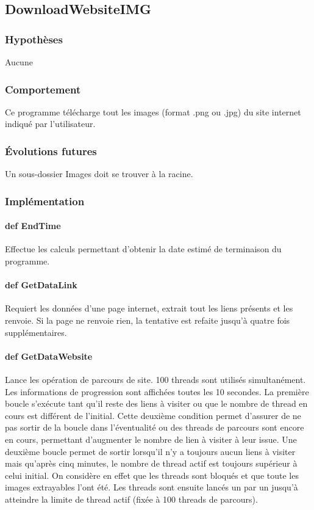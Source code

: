 \documentclass[a4paper,12pt]{article}
\begin{document}
\subsection{DownloadWebsiteIMG}
\subsubsection{Hypothèses}
Aucune
\subsubsection{Comportement}
Ce programme télécharge tout les images (format .png ou .jpg) du site internet indiqué par l'utilisateur.
\subsubsection{Évolutions futures}
Un sous-dossier Images doit se trouver à la racine.
\subsubsection{Implémentation}
\paragraph{def EndTime}
Effectue les calculs permettant d'obtenir la date estimé de terminaison du programme. 
\paragraph{def GetDataLink}
Requiert les données d'une page internet, extrait tout les liens présents et les renvoie. Si la page ne renvoie rien, la tentative est refaite jusqu'à quatre fois supplémentaires.

\paragraph{def GetDataWebsite}
Lance les opération de parcours de site. 100 threads sont utilisés simultanément. Les informations de progression sont affichées toutes les 10 secondes.
La première boucle s'exécute tant qu'il reste des liens à visiter ou que le nombre de thread en cours est différent de l'initial. Cette deuxième condition permet d'assurer de ne pas sortir de la boucle dans l'éventualité ou des threads de parcours sont encore en cours, permettant d'augmenter le nombre de lien à visiter à leur issue.
Une deuxième boucle permet de sortir lorsqu'il n'y a toujours aucun liens à visiter mais qu'après cinq minutes, le nombre de thread actif est toujours supérieur à celui initial. On considère en effet que les threads sont bloqués et que toute les images extrayables l'ont été.
Les threads sont ensuite lancés un par un jusqu'à atteindre la limite de thread actif (fixée à 100 threads de parcours).
\end{document}
